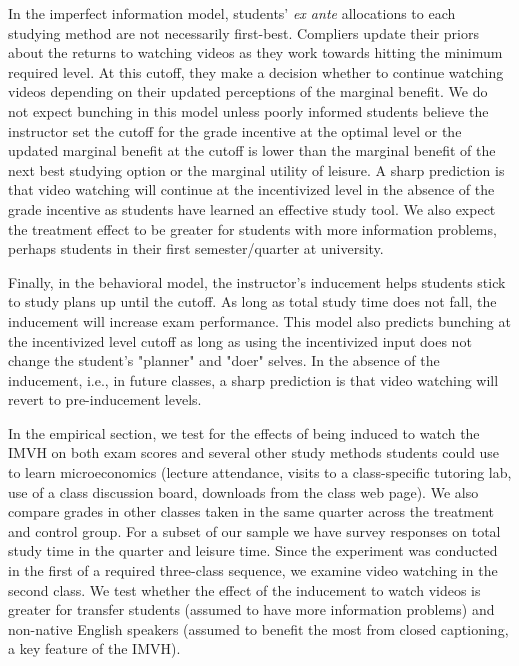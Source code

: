 \documentclass[12pt]{article}
\begin{document}
In the imperfect information model, students' \textit{ex ante} allocations to each studying method are not necessarily first-best. Compliers update their priors about the returns to watching videos as they work towards hitting the minimum required level. At this cutoff, they make a decision whether to continue watching videos depending on their updated perceptions of the marginal benefit. We do not expect bunching in this model unless poorly informed students believe the instructor set the cutoff for the grade incentive at the optimal level or the updated marginal benefit at the cutoff is lower than the marginal benefit of the next best studying option or the marginal utility of leisure. A sharp prediction is that video watching will continue at the incentivized level in the absence of the grade incentive as students have learned an effective study tool. We also expect the treatment effect to be greater for students with more information problems, perhaps students in their first semester/quarter at university.

Finally, in the behavioral model, the instructor's inducement helps students stick to study plans up until the cutoff. As long as total study time does not fall, the inducement will increase exam performance. This model also predicts bunching at the incentivized level cutoff as long as using the incentivized input does not change the student's "planner" and "doer" selves. In the absence of the inducement, i.e., in future classes, a sharp prediction is that video watching will revert to pre-inducement levels.

In the empirical section, we test for the effects of being induced to watch the IMVH on both exam scores and several other study methods students could use to learn microeconomics (lecture attendance, visits to a class-specific tutoring lab, use of a class discussion board, downloads from the class web page). We also compare grades in other classes taken in the same quarter across the treatment and control group. For a subset of our sample we have survey responses on total study time in the quarter and leisure time. Since the experiment was conducted in the first of a required three-class sequence, we examine video watching in the second class. We test whether the effect of the inducement to watch videos is greater for transfer students (assumed to have more information problems) and non-native English speakers (assumed to benefit the most from closed captioning, a key feature of the IMVH). %
\end{document}
